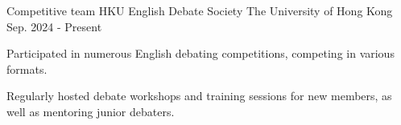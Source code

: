 

\begin{cventries}


  \cventry
    {Competitive team} %
    {HKU English Debate Society} %
    {The University of Hong Kong} %
    {Sep. 2024 - Present} %
    {
      \begin{cvitems} %
        \item {Participated in numerous English debating competitions, competing in various formats.}
        \item {Regularly hosted debate workshops and training sessions for new members, as well as mentoring junior debaters.}
      \end{cvitems}
    }

\end{cventries}
